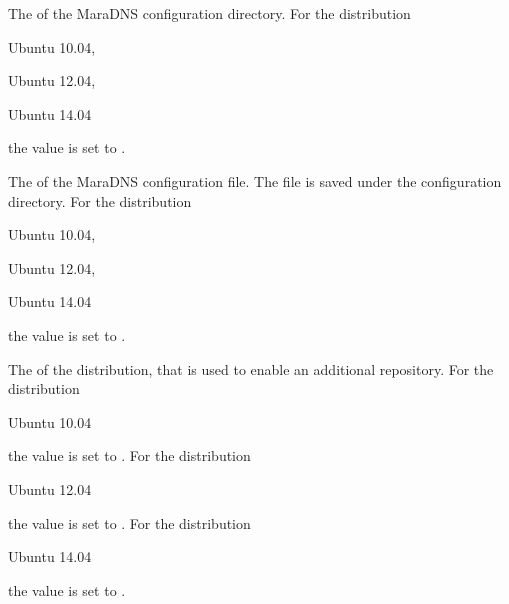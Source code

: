 
The  of the MaraDNS configuration directory.
For the distribution
\begin{inparaitem}
\item[\TheDistribution{ubuntu}] Ubuntu 10.04,
\item[\TheDistribution{ubuntu}] Ubuntu 12.04,
\item[\TheDistribution{ubuntu}] Ubuntu 14.04
\end{inparaitem}
the value is set to .


The  of the MaraDNS configuration file. The file is saved
under the configuration directory.
For the distribution
\begin{inparaitem}
\item[\TheDistribution{ubuntu}] Ubuntu 10.04,
\item[\TheDistribution{ubuntu}] Ubuntu 12.04,
\item[\TheDistribution{ubuntu}] Ubuntu 14.04
\end{inparaitem}
the value is set to .


The  of the distribution, that is used to enable an additional
repository. For the distribution
\begin{inparaitem}
\item[\TheDistribution{ubuntu}] Ubuntu 10.04
\end{inparaitem}
the value is set to .
For the distribution
\begin{inparaitem}
\item[\TheDistribution{ubuntu}] Ubuntu 12.04
\end{inparaitem}
the value is set to .
For the distribution
\begin{inparaitem}
\item[\TheDistribution{ubuntu}] Ubuntu 14.04
\end{inparaitem}
the value is set to .

